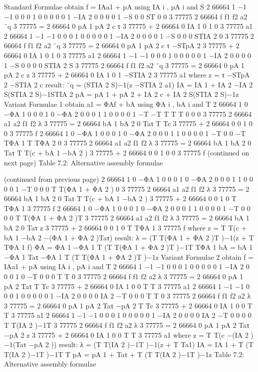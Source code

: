 Standard Formulae obtain f = IAa1 + pA using IA i , pA i and S 2 66664 1 −1 −1 0 0 0 1 0 0 0 0 0 1 −IA 2 0 0 0 0 1 −S 0 0 ST 0 0 3 77775 2 66664 f f1 f2 a2 ¨q 3 77775 = 2 66664 0 pA 1 pA 2 c τ 3 77775 + 2 66664 0 IA 1 0 1 0 3 77775 a1 2 66664 1 −1 −1 0 0 0 1 0 0 0 0 0 1 −IA 2 0 0 0 0 1 −S 0 0 0 STIA 2 0 3 77775 2 66664 f f1 f2 a2 ¨q 3 77775 = 2 66664 0 pA 1 pA 2 c τ −STpA 2 3 77775 + 2 66664 0 IA 1 0 1 0 3 77775 a1 2 66664 1 −1 −1 0 0 0 1 0 0 0 0 0 1 −IA 2 0 0 0 0 1 −S 0 0 0 0 STIA 2 S 3 77775 2 66664 f f1 f2 a2 ¨q 3 77775 = 2 66664 0 pA 1 pA 2 c z 3 77775 + 2 66664 0 IA 1 0 1 −STIA 2 3 77775 a1 where z = τ −STpA 2 −STIA 2 c result: ¨q = (STIA 2 S)−1(z −STIA 2 a1) IA = IA 1 + IA 2 −IA 2 S(STIA 2 S)−1STIA 2 pA = pA 1 + pA 2 + IA 2 c + IA 2 S(STIA 2 S)−1z Variant Formulae 1 obtain a1 = ΦAf + bA using ΦA i , bA i and T 2 66664 1 0 −ΦA 1 0 0 0 1 0 −ΦA 2 0 0 0 1 1 0 0 0 0 1 −T −T T T T 0 0 0 3 77775 2 66664 a1 a2 f1 f2 λ 3 77775 = 2 66664 bA 1 bA 2 0 Taτ T Tc 3 77775 + 2 66664 0 0 1 0 0 3 77775 f 2 66664 1 0 −ΦA 1 0 0 0 1 0 −ΦA 2 0 0 0 1 1 0 0 0 0 1 −T 0 0 −T TΦA 1 T TΦA 2 0 3 77775 2 66664 a1 a2 f1 f2 λ 3 77775 = 2 66664 bA 1 bA 2 0 Taτ T T(c + bA 1 −bA 2 ) 3 77775 + 2 66664 0 0 1 0 0 3 77775 f (continued on next page) Table 7.2: Alternative assembly formulae

(continued from previous page) 2 66664 1 0 −ΦA 1 0 0 0 1 0 −ΦA 2 0 0 0 1 1 0 0 0 0 1 −T 0 0 0 T T(ΦA 1 + ΦA 2 ) 0 3 77775 2 66664 a1 a2 f1 f2 λ 3 77775 = 2 66664 bA 1 bA 2 0 Taτ T T(c + bA 1 −bA 2 ) 3 77775 + 2 66664 0 0 1 0 T TΦA 1 3 77775 f 2 66664 1 0 −ΦA 1 0 0 0 1 0 −ΦA 2 0 0 0 1 1 0 0 0 0 1 −T 0 0 0 0 T T(ΦA 1 + ΦA 2 )T 3 77775 2 66664 a1 a2 f1 f2 λ 3 77775 = 2 66664 bA 1 bA 2 0 Taτ z 3 77775 + 2 66664 0 0 1 0 T TΦA 1 3 77775 f where z = T T(c + bA 1 −bA 2 −(ΦA 1 + ΦA 2 )Taτ) result: λ = (T T(ΦA 1 + ΦA 2 )T )−1(z + T TΦA 1 f) ΦA = ΦA 1 −ΦA 1 T (T T(ΦA 1 + ΦA 2 )T )−1T TΦA 1 bA = bA 1 −ΦA 1 Taτ −ΦA 1 T (T T(ΦA 1 + ΦA 2 )T )−1z Variant Formulae 2 obtain f = IAa1 + pA using IA i , pA i and T 2 66664 1 −1 −1 0 0 0 1 0 0 0 0 0 1 −IA 2 0 0 0 1 0 −T 0 0 0 T T 0 3 77775 2 66664 f f1 f2 a2 λ 3 77775 = 2 66664 0 pA 1 pA 2 Taτ T Tc 3 77775 + 2 66664 0 IA 1 0 0 T T 3 77775 a1 2 66664 1 −1 −1 0 0 0 1 0 0 0 0 0 1 −IA 2 0 0 0 0 IA 2 −T 0 0 0 T T 0 3 77775 2 66664 f f1 f2 a2 λ 3 77775 = 2 66664 0 pA 1 pA 2 Taτ −pA 2 T Tc 3 77775 + 2 66664 0 IA 1 0 0 T T 3 77775 a1 2 66664 1 −1 −1 0 0 0 1 0 0 0 0 0 1 −IA 2 0 0 0 0 IA 2 −T 0 0 0 0 T T(IA 2 )−1T 3 77775 2 66664 f f1 f2 a2 λ 3 77775 = 2 66664 0 pA 1 pA 2 Taτ −pA 2 z 3 77775 + 2 66664 0 IA 1 0 0 T T 3 77775 a1 where z = T T(c −(IA 2 )−1(Taτ −pA 2 )) result: λ = (T T(IA 2 )−1T )−1(z + T Ta1) IA = IA 1 + T (T T(IA 2 )−1T )−1T T pA = pA 1 + Taτ + T (T T(IA 2 )−1T )−1z Table 7.2: Alternative assembly formulae

